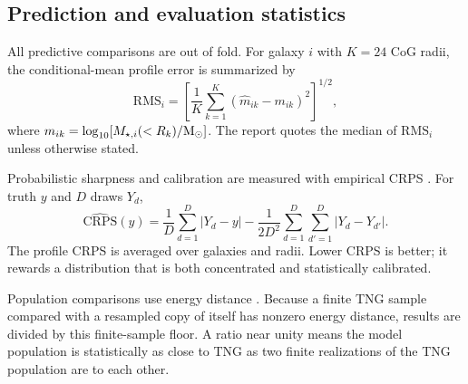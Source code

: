 \subsection{Prediction and evaluation statistics}
\label{sec:metrics}

All predictive comparisons are out of fold. For galaxy $i$ with $K=24$ CoG
radii, the conditional-mean profile error is summarized by
\begin{equation}
  \mathrm{RMS}_i=\left[\frac{1}{K}\sum_{k=1}^{K}
  \left(\widehat{m}_{ik}-m_{ik}\right)^2\right]^{1/2},
  \label{eq:profile_rms}
\end{equation}
where $m_{ik}=\log_{10}[M_{\star,i}(<R_k)/\mathrm{M}_{\odot}]$. The report quotes the median
of $\mathrm{RMS}_i$ unless otherwise stated.

Probabilistic sharpness and calibration are measured with empirical CRPS
\citep{Gneiting2007}. For truth $y$ and $D$ draws $Y_d$,
\begin{equation}
  \widehat{\mathrm{CRPS}}(y)=
  \frac{1}{D}\sum_{d=1}^{D}|Y_d-y|
  -\frac{1}{2D^2}\sum_{d=1}^{D}\sum_{d'=1}^{D}|Y_d-Y_{d'}|.
  \label{eq:crps}
\end{equation}
The profile CRPS is averaged over galaxies and radii. Lower CRPS is better; it
rewards a distribution that is both concentrated and statistically calibrated.

Population comparisons use energy distance \citep{Szekely2013}. Because a
finite TNG sample compared with a resampled copy of itself has nonzero energy
distance, results are divided by this finite-sample floor. A ratio near unity
means the model population is statistically as close to TNG as two finite
realizations of the TNG population are to each other.
